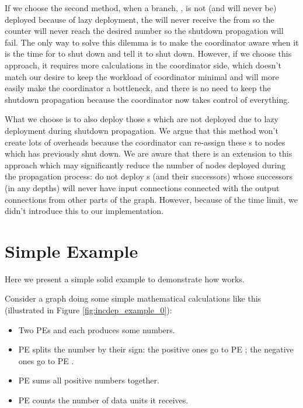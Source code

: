 If we choose the second method, when a branch, \eg \ndB, is not (and will never be) deployed because of lazy deployment, the \ndS will never receive the \dEOS from \ndB so the counter will never reach the desired number so the shutdown propagation will fail. The only way to solve this dilemma is to make the coordinator aware when it is the time for \ndS to shut down and tell it to shut down. However, if we choose this approach, it requires more calculations in the coordinator side, which doesn't match our desire to keep the workload of coordinator minimal and will more easily make the coordinator a bottleneck, and there is no need to keep the shutdown propagation because the coordinator now takes control of everything.

What we choose is to also deploy those \tPEInst{}s which are not deployed due to lazy deployment during shutdown propagation. We argue that this method won't create lots of overheads because the coordinator can re-assign these \tPEInst{}s to nodes which has previously shut down. We are aware that there is an extension to this approach which may significantly reduce the number of nodes deployed during the propagation process: do not deploy \tPEInst{}s (and their successors) whose successors (in any depths) will never have input connections connected with the output connections from other parts of the graph. However, because of the time limit, we didn't introduce this to our implementation.

\section{Simple Example} \label{sec:incdep_example}
Here we present a simple solid example to demonstrate how \tincdep works.

Consider a graph doing some simple mathematical calculations like this (illustrated in Figure \ref{fig:incdep_example_0}):
  

\begin{itemize}
	\item Two PEs \ndA and \ndB each produces some numbers.
	\item PE \ndC splits the number by their sign: the positive ones go to PE \ndD; the negative ones go to PE \ndE.
	\item PE \ndD sums all positive numbers together.
	\item PE \ndE counts the number of data units it receives.
\end{itemize}

